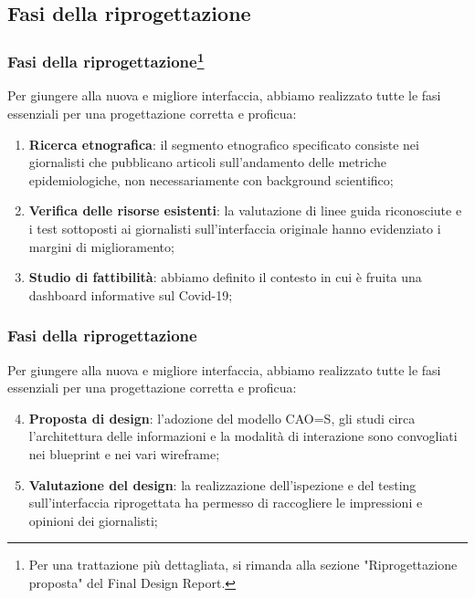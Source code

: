 
\subsection{Fasi della riprogettazione}

\begin{frame}
    \frametitle{Fasi della riprogettazione\footnote{Per una trattazione più dettagliata, si rimanda alla sezione "Riprogettazione proposta" del Final Design Report.}}
    Per giungere alla nuova e migliore interfaccia, abbiamo realizzato tutte le fasi essenziali per una progettazione corretta e proficua:
    \begin{enumerate}
        \item<1-> \textbf{Ricerca etnografica}: il segmento etnografico specificato consiste nei giornalisti che pubblicano articoli sull'andamento delle metriche epidemiologiche, non necessariamente con background scientifico;
        \item<2-> \textbf{Verifica delle risorse esistenti}: la valutazione di linee guida riconosciute e i test sottoposti ai giornalisti sull'interfaccia originale hanno evidenziato i margini di miglioramento;
        \item<3->  \textbf{Studio di fattibilità}: abbiamo definito il contesto in cui è fruita una dashboard informative sul Covid-19;
    \end{enumerate}  

\end{frame}

\begin{frame}
    \frametitle{Fasi della riprogettazione}
    Per giungere alla nuova e migliore interfaccia, abbiamo realizzato tutte le fasi essenziali per una progettazione corretta e proficua: 
    \begin{enumerate}
        \setcounter{enumi}{3}
        \item<1-> \textbf{Proposta di design}: l'adozione del modello CAO=S, gli studi circa l'architettura delle informazioni e la modalità di interazione sono convogliati nei blueprint e nei vari wireframe;
        \item<2-> \textbf{Valutazione del design}: la realizzazione dell'ispezione e del testing sull'interfaccia riprogettata ha permesso di raccogliere le impressioni e opinioni dei giornalisti;
    \end{enumerate}  

\end{frame}